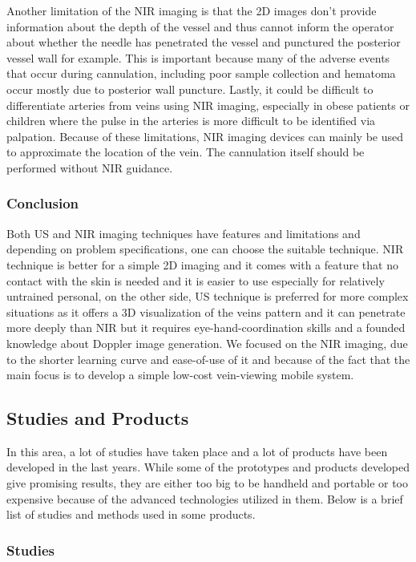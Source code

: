 Another limitation of the NIR imaging is that the 2D images don’t provide information about the depth of the vessel and thus cannot inform the operator about whether the needle has penetrated the vessel and punctured the posterior vessel wall for example. This is important because many of the adverse events that occur during cannulation, including poor sample collection and hematoma occur mostly due to posterior wall puncture.
Lastly, it could be difficult to differentiate arteries from veins using NIR imaging, especially in obese patients or children where the pulse in the arteries is more difficult to be identified via palpation. Because of these limitations, NIR imaging devices can mainly be used to approximate the location of the vein. The cannulation itself should be performed without NIR guidance.

\subsubsection{Conclusion}
Both US and NIR imaging techniques have features and limitations and depending on problem specifications, one can choose the suitable technique. NIR technique is better for a simple 2D imaging and it comes with a feature that no contact with the skin is needed and it is easier to use especially for relatively untrained personal, on the other side, US technique is preferred for more complex situations as it offers a 3D visualization of the veins pattern and it can penetrate more deeply than NIR but it requires eye-hand-coordination skills and a founded knowledge about Doppler image generation. We focused on the NIR imaging, due to the shorter learning curve and ease-of-use of it and because of the fact that the main focus is to develop a simple low-cost vein-viewing mobile system.


\subsection{Studies and Products}

In this area, a lot of studies have taken place and a lot of products have been developed in the last years. While some of the prototypes and products developed give promising results, they are either too big to be handheld and portable or too expensive because of the advanced technologies utilized in them. Below is a brief list of studies and methods used in some products.

\subsubsection{Studies}

